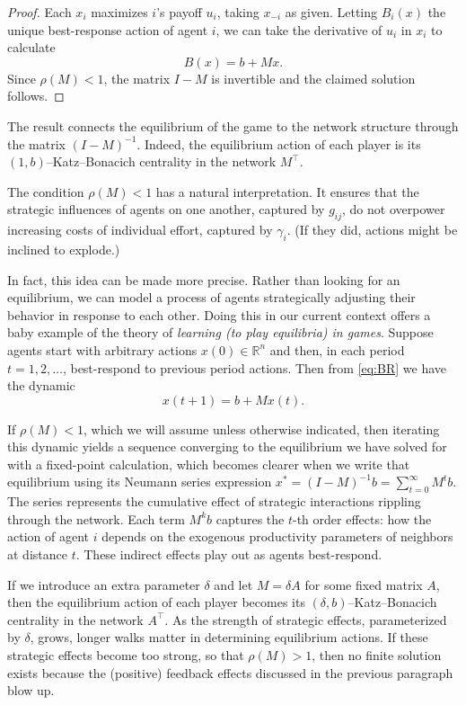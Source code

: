 \documentclass{notices}
\theoremstyle{definition}\newtheorem{problem}{Problem}
\begin{document}
\begin{proof}
Each $x_i$ maximizes $i$'s payoff $u_i$,  taking $x_{-i}$ as given. Letting $B_i(x)$ the unique best-response action of agent $i$, we can take the derivative of $u_i$ in $x_i$ to calculate
\begin{equation}
B(x) = b + M x. \label{eq:BR}
\end{equation}
Since $\rho(M) < 1$, the matrix $I - M$ is invertible  and the claimed solution follows.
\end{proof}


The result connects the equilibrium of the game to the network structure through the matrix $(I - M)^{-1}$. Indeed, the equilibrium action of each player is its $(1,b)$--Katz--Bonacich centrality in the network $M^\top$.


The condition $\rho(M) < 1$ has a natural interpretation. It ensures that the strategic influences of agents on one another, captured by $g_{ij}$, do not overpower increasing costs of individual effort, captured by $\gamma_i$. (If they did, actions might be inclined to explode.)

In fact, this idea can be made more precise. Rather than looking for an equilibrium, we can model a process of agents strategically adjusting their behavior in response to each other. Doing this in our current context offers a baby example of the theory of \emph{learning (to play equilibria) in games}. Suppose agents start with arbitrary actions $x(0) \in \mathbb{R}^n$ and then, in each period $t=1,2,\ldots$, best-respond to previous period actions. Then from \cref{eq:BR} we have the dynamic $$ x(t+1) = b + Mx(t).$$ 

If $\rho(M)<1$, which we will assume unless otherwise indicated, then iterating this dynamic yields a sequence converging to the equilibrium we have solved for with a fixed-point calculation, which becomes clearer when we write that equilibrium using its Neumann series expression $
x^* = (I - M)^{-1} b = \sum_{t=0}^\infty M^t b.
$
The series represents the cumulative effect of strategic interactions rippling through the network. Each term $M^k b$ captures the $t$-th order effects: how the action of agent $i$ depends on the exogenous productivity parameters of neighbors at distance $t$. These indirect effects play out as agents best-respond.  


If we introduce an extra parameter $\delta$ and let $M= \delta A$ for some fixed matrix $A$, then the equilibrium action of each player becomes its $(\delta,{b})$--Katz--Bonacich centrality in the network $A^\top$. As the strength of strategic effects,  parameterized by $\delta$, grows, longer walks matter in determining equilibrium actions. If these strategic effects become too strong, so that $\rho(M)>1$, then no finite solution exists because the (positive) feedback effects discussed in the previous paragraph blow up.
\end{document}

